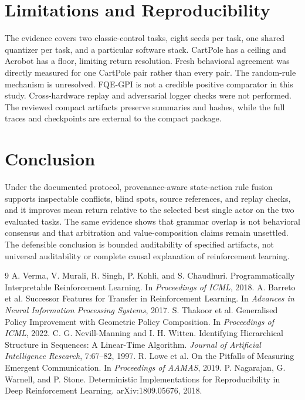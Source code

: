 \documentclass[11pt,a4paper]{article}
\begin{document}
\section{Limitations and Reproducibility}
The evidence covers two classic-control tasks, eight seeds per task, one shared quantizer per task, and a particular software stack. CartPole has a ceiling and Acrobot has a floor, limiting return resolution. Fresh behavioral agreement was directly measured for one CartPole pair rather than every pair. The random-rule mechanism is unresolved. FQE-GPI is not a credible positive comparator in this study. Cross-hardware replay and adversarial logger checks were not performed. The reviewed compact artifacts preserve summaries and hashes, while the full traces and checkpoints are external to the compact package.

\section{Conclusion}
Under the documented protocol, provenance-aware state-action rule fusion supports inspectable conflicts, blind spots, source references, and replay checks, and it improves mean return relative to the selected best single actor on the two evaluated tasks. The same evidence shows that grammar overlap is not behavioral consensus and that arbitration and value-composition claims remain unsettled. The defensible conclusion is bounded auditability of specified artifacts, not universal auditability or complete causal explanation of reinforcement learning.

\begin{thebibliography}{9}
 A. Verma, V. Murali, R. Singh, P. Kohli, and S. Chaudhuri. Programmatically Interpretable Reinforcement Learning. In \emph{Proceedings of ICML}, 2018.
 A. Barreto et al. Successor Features for Transfer in Reinforcement Learning. In \emph{Advances in Neural Information Processing Systems}, 2017.
 S. Thakoor et al. Generalised Policy Improvement with Geometric Policy Composition. In \emph{Proceedings of ICML}, 2022.
 C. G. Nevill-Manning and I. H. Witten. Identifying Hierarchical Structure in Sequences: A Linear-Time Algorithm. \emph{Journal of Artificial Intelligence Research}, 7:67--82, 1997.
 R. Lowe et al. On the Pitfalls of Measuring Emergent Communication. In \emph{Proceedings of AAMAS}, 2019.
 P. Nagarajan, G. Warnell, and P. Stone. Deterministic Implementations for Reproducibility in Deep Reinforcement Learning. arXiv:1809.05676, 2018.
\end{thebibliography}
\end{document}
